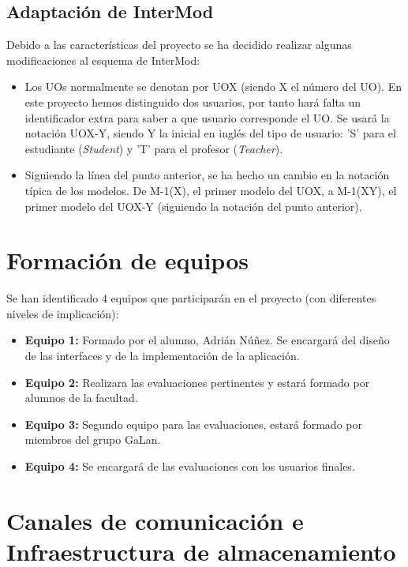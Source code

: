 \subsection{Adaptación de InterMod}
\label{adaptacion-intermod}

Debido a las características del proyecto se ha decidido realizar algunas modificaciones al esquema de InterMod:

\begin{itemize}
\item Los UOs normalmente se denotan por UOX (siendo X el número del UO). En este proyecto hemos distinguido dos usuarios, por tanto hará falta un identificador extra para saber a que usuario corresponde el UO. Se usará la notación UOX-Y, siendo Y la inicial en inglés del tipo de usuario: 'S' para el estudiante (\textit{Student}) y 'T' para el profesor (\textit{Teacher}).
\item Siguiendo la línea del punto anterior, se ha hecho un cambio en la notación típica de los modelos. De M-1(X), el primer modelo del UOX, a M-1(XY), el primer modelo del UOX-Y (siguiendo la notación del punto anterior).
\end{itemize}

\section{Formación de equipos}
\label{equipos}

Se han identificado 4 equipos que participarán en el proyecto (con diferentes niveles de implicación):

\begin{itemize}
\item \textbf{Equipo 1:} Formado por el alumno, Adrián Núñez. Se encargará del diseño de las interfaces y de la implementación de la aplicación.
\item \textbf{Equipo 2:} Realizara las evaluaciones pertinentes y estará formado por alumnos de la facultad.
\item \textbf{Equipo 3:} Segundo equipo para las evaluaciones, estará formado por miembros del grupo GaLan.
\item \textbf{Equipo 4:} Se encargará de las evaluaciones con los usuarios finales.
\end{itemize}

\section{Canales de comunicación e Infraestructura de almacenamiento}
\label{infraestructura}

